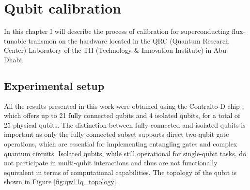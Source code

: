 \chapter{Qubit calibration}

In this chapter I will describe the process of calibration for superconducting flux-tunable transmon on the hardware located in the QRC (Quantum Research Center) Laboratory of the TII (Technology \& Innovation Institute) in Abu Dhabi.

\section{Experimental setup}
All the results presented in this work were obtained using the Contralto-D chip \cite{qw11q}, which offers up to 21 fully connected qubits and 4 isolated qubits, for a total of 25 physical qubits.
The distinction between fully connected and isolated qubits is important as only the fully connected subset supports direct two-qubit gate operations, which are essential for implementing entangling gates and complex quantum circuits. 
Isolated qubits, while still operational for single-qubit tasks, do not participate in multi-qubit interactions and thus are not functionally equivalent in terms of computational capabilities.
The topology of the qubit is shown in Figure \ref{fig:qw11q_topology}.

